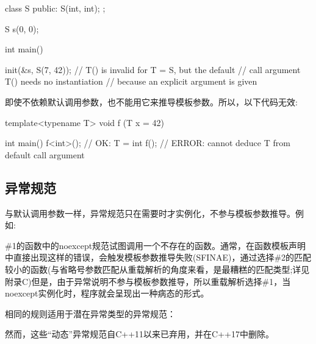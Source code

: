 \begin{cpp}
class S {
	public:
	S(int, int);
};

S s(0, 0);

int main()

{
	init(&s, S(7, 42)); // T() is invalid for T = S, but the default
	// call argument T() needs no instantiation
	// because an explicit argument is given
}
\end{cpp}

即使不依赖默认调用参数，也不能用它来推导模板参数。所以，以下代码无效:

\begin{cpp}
template<typename T>
void f (T x = 42)
{ }

int main()
{
	f<int>(); // OK: T = int
	f(); // ERROR: cannot deduce T from default call argument
}
\end{cpp}

\subsection{异常规范}

与默认调用参数一样，异常规范只在需要时才实例化，不参与模板参数推导。例如:


\#1的函数中的noexcept规范试图调用一个不存在的函数。通常，在函数模板声明中直接出现这样的错误，会触发模板参数推导失败(SFINAE)，通过选择\#2的匹配较小的函数(与省略号参数匹配从重载解析的角度来看，是最糟糕的匹配类型;详见附录C)但是，由于异常说明不参与模板参数推导，所以重载解析选择\#1，当noexcept实例化时，程序就会呈现出一种病态的形式。

相同的规则适用于潜在异常类型的异常规范：


然而，这些“动态”异常规范自C++11以来已弃用，并在C++17中删除。


















